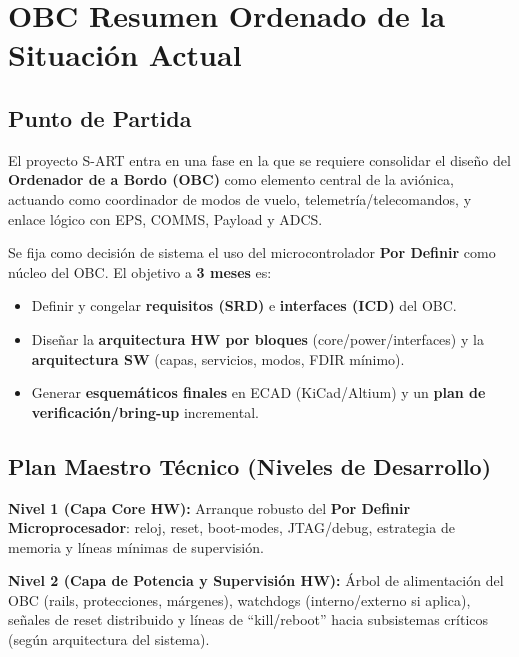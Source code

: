 


\chapter{OBC  Resumen Ordenado de la Situación Actual}

\section{Punto de Partida}
El proyecto S-ART entra en una fase en la que se requiere consolidar el diseño del \textbf{Ordenador de a Bordo (OBC)} como elemento central de la aviónica, actuando como coordinador de modos de vuelo, telemetría/telecomandos, y enlace lógico con EPS, COMMS, Payload y ADCS.

Se fija como decisión de sistema el uso del microcontrolador \textbf{Por Definir} como núcleo del OBC. El objetivo a \textbf{3 meses} es:
\begin{itemize}
  \item Definir y congelar \textbf{requisitos (SRD)} e \textbf{interfaces (ICD)} del OBC.
  \item Diseñar la \textbf{arquitectura HW por bloques} (core/power/interfaces) y la \textbf{arquitectura SW} (capas, servicios, modos, FDIR mínimo).
  \item Generar \textbf{esquemáticos finales} en ECAD (KiCad/Altium) y un \textbf{plan de verificación/bring-up} incremental.
\end{itemize}

\section{Plan Maestro Técnico (Niveles de Desarrollo)}
\textbf{Nivel 1 (Capa Core HW):} Arranque robusto del \textbf{Por Definir Microprocesador}: reloj, reset, boot-modes, JTAG/debug, estrategia de memoria y líneas mínimas de supervisión.

\textbf{Nivel 2 (Capa de Potencia y Supervisión HW):} Árbol de alimentación del OBC (rails, protecciones, márgenes), watchdogs (interno/externo si aplica), señales de reset distribuido y líneas de “kill/reboot” hacia subsistemas críticos (según arquitectura del sistema).

